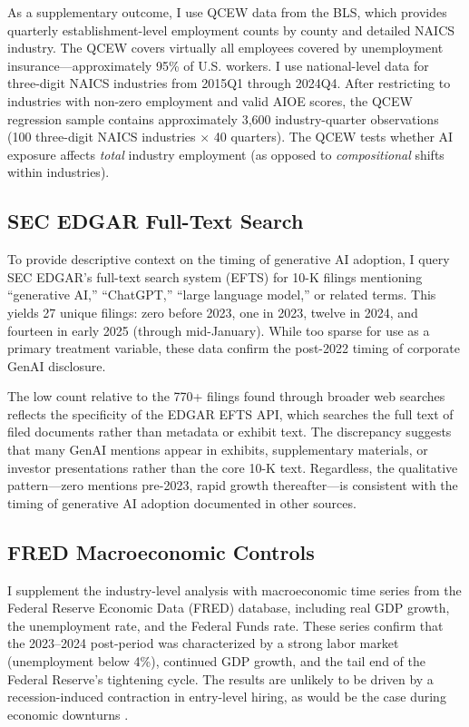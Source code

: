 \documentclass[12pt]{article}
\begin{document}
As a supplementary outcome, I use QCEW data from the BLS, which provides quarterly establishment-level employment counts by county and detailed NAICS industry. The QCEW covers virtually all employees covered by unemployment insurance---approximately 95\% of U.S. workers. I use national-level data for three-digit NAICS industries from 2015Q1 through 2024Q4. After restricting to industries with non-zero employment and valid AIOE scores, the QCEW regression sample contains approximately 3,600 industry-quarter observations (100 three-digit NAICS industries $\times$ 40 quarters). The QCEW tests whether AI exposure affects \emph{total} industry employment (as opposed to \emph{compositional} shifts within industries).

\subsection{SEC EDGAR Full-Text Search}

To provide descriptive context on the timing of generative AI adoption, I query SEC EDGAR's full-text search system (EFTS) for 10-K filings mentioning ``generative AI,'' ``ChatGPT,'' ``large language model,'' or related terms. This yields 27 unique filings: zero before 2023, one in 2023, twelve in 2024, and fourteen in early 2025 (through mid-January). While too sparse for use as a primary treatment variable, these data confirm the post-2022 timing of corporate GenAI disclosure.

The low count relative to the 770+ filings found through broader web searches reflects the specificity of the EDGAR EFTS API, which searches the full text of filed documents rather than metadata or exhibit text. The discrepancy suggests that many GenAI mentions appear in exhibits, supplementary materials, or investor presentations rather than the core 10-K text. Regardless, the qualitative pattern---zero mentions pre-2023, rapid growth thereafter---is consistent with the timing of generative AI adoption documented in other sources.

\subsection{FRED Macroeconomic Controls}

I supplement the industry-level analysis with macroeconomic time series from the Federal Reserve Economic Data (FRED) database, including real GDP growth, the unemployment rate, and the Federal Funds rate. These series confirm that the 2023--2024 post-period was characterized by a strong labor market (unemployment below 4\%), continued GDP growth, and the tail end of the Federal Reserve's tightening cycle. The results are unlikely to be driven by a recession-induced contraction in entry-level hiring, as would be the case during economic downturns \citep{hershbein2018}.
\end{document}
